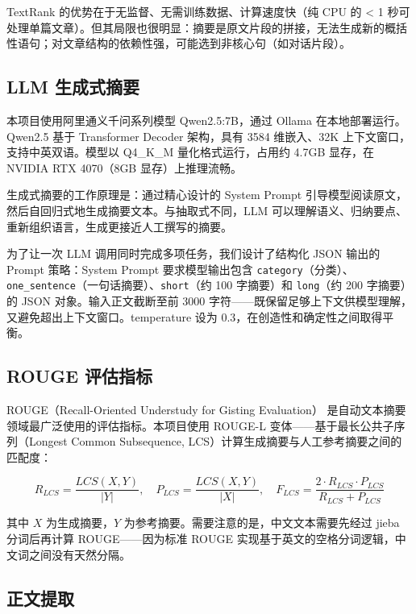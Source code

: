 \documentclass[12pt,a4paper]{ctexart}
\begin{document}
TextRank 的优势在于无监督、无需训练数据、计算速度快（纯 CPU 的 < 1 秒可处理单篇文章）。但其局限也很明显：摘要是原文片段的拼接，无法生成新的概括性语句；对文章结构的依赖性强，可能选到非核心句（如对话片段）。

\subsection{LLM 生成式摘要}

本项目使用阿里通义千问系列模型 Qwen2.5:7B\cite{qwen}，通过 Ollama 在本地部署运行。Qwen2.5 基于 Transformer Decoder 架构，具有 3584 维嵌入、32K 上下文窗口，支持中英双语。模型以 Q4\_K\_M 量化格式运行，占用约 4.7GB 显存，在 NVIDIA RTX 4070（8GB 显存）上推理流畅。

生成式摘要的工作原理是：通过精心设计的 System Prompt 引导模型阅读原文，然后自回归式地生成摘要文本。与抽取式不同，LLM 可以理解语义、归纳要点、重新组织语言，生成更接近人工撰写的摘要。

为了让一次 LLM 调用同时完成多项任务，我们设计了结构化 JSON 输出的 Prompt 策略：System Prompt 要求模型输出包含 \texttt{category}（分类）、\texttt{one\_sentence}（一句话摘要）、\texttt{short}（约 100 字摘要）和 \texttt{long}（约 200 字摘要）的 JSON 对象。输入正文截断至前 3000 字符——既保留足够上下文供模型理解，又避免超出上下文窗口。temperature 设为 0.3，在创造性和确定性之间取得平衡。

\subsection{ROUGE 评估指标}

ROUGE（Recall-Oriented Understudy for Gisting Evaluation）\cite{rouge} 是自动文本摘要领域最广泛使用的评估指标。本项目使用 ROUGE-L 变体——基于最长公共子序列（Longest Common Subsequence, LCS）计算生成摘要与人工参考摘要之间的匹配度：

\begin{equation}
R_{LCS} = \frac{LCS(X, Y)}{|Y|}, \quad
P_{LCS} = \frac{LCS(X, Y)}{|X|}, \quad
F_{LCS} = \frac{2 \cdot R_{LCS} \cdot P_{LCS}}{R_{LCS} + P_{LCS}}
\end{equation}

其中 $X$ 为生成摘要，$Y$ 为参考摘要。需要注意的是，中文文本需要先经过 jieba 分词后再计算 ROUGE——因为标准 ROUGE 实现基于英文的空格分词逻辑，中文词之间没有天然分隔。

\subsection{正文提取}
\end{document}
